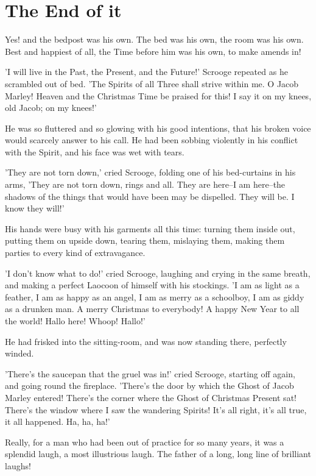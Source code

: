 \chapter{The End of it}

Yes! and the bedpost was his own. The bed was his own, the room was his
own. Best and happiest of all, the Time before him was his own, to make
amends in!

'I will live in the Past, the Present, and the Future!' Scrooge repeated
as he scrambled out of bed. 'The Spirits of all Three shall strive
within me. O Jacob Marley! Heaven and the Christmas Time be praised for
this! I say it on my knees, old Jacob; on my knees!'

He was so fluttered and so glowing with his good intentions, that his
broken voice would scarcely answer to his call. He had been sobbing
violently in his conflict with the Spirit, and his face was wet with
tears.

'They are not torn down,' cried Scrooge, folding one of his bed-curtains
in his arms, 'They are not torn down, rings and all. They are here--I am
here--the shadows of the things that would have been may be dispelled.
They will be. I know they will!'

His hands were busy with his garments all this time: turning them inside
out, putting them on upside down, tearing them, mislaying them, making
them parties to every kind of extravagance.

'I don't know what to do!' cried Scrooge, laughing and crying in the
same breath, and making a perfect Laocoon of himself with his stockings.
'I am as light as a feather, I am as happy as an angel, I am as merry as
a schoolboy, I am as giddy as a drunken man. A merry Christmas to
everybody! A happy New Year to all the world! Hallo here! Whoop! Hallo!'

He had frisked into the sitting-room, and was now standing there,
perfectly winded.

'There's the saucepan that the gruel was in!' cried Scrooge, starting
off again, and going round the fireplace. 'There's the door by which the
Ghost of Jacob Marley entered! There's the corner where the Ghost of
Christmas Present sat! There's the window where I saw the wandering
Spirits! It's all right, it's all true, it all happened. Ha, ha, ha!'

Really, for a man who had been out of practice for so many years, it was
a splendid laugh, a most illustrious laugh. The father of a long, long
line of brilliant laughs!

